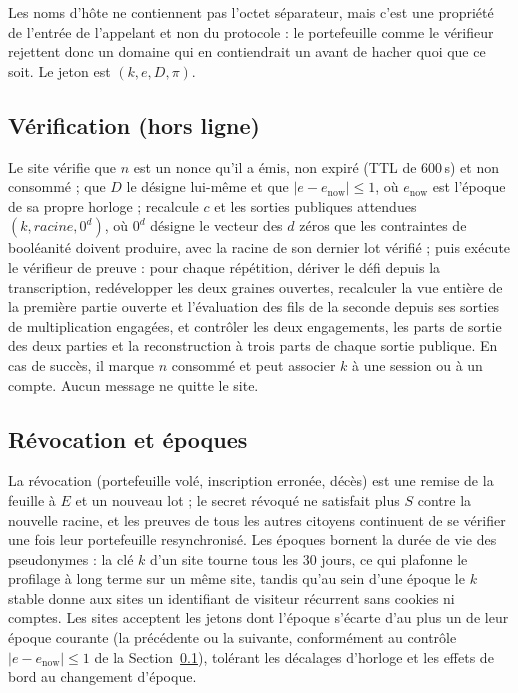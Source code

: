 \documentclass[11pt]{article}
\theoremstyle{definition}
\begin{document}
\noindent
Les noms d'hôte ne contiennent pas l'octet séparateur, mais c'est une propriété de
l'entrée de l'appelant et non du protocole : le portefeuille comme le vérifieur rejettent
donc un domaine qui en contiendrait un avant de hacher quoi que ce soit. Le jeton est $(k,
e, D, \pi)$.

\subsection{Vérification (hors ligne)}
\label{sec:verification}

Le site vérifie que $n$ est un nonce qu'il a émis, non expiré (TTL de 600\,s) et non
consommé ; que $D$ le désigne lui-même et que $|e - e_{\mathrm{now}}| \le 1$, où
$e_{\mathrm{now}}$ est l'époque de sa propre horloge ; recalcule $c$ et les sorties
publiques attendues $(k, \mathit{racine}, 0^d)$, où $0^d$ désigne le vecteur des $d$ zéros
que les contraintes de booléanité doivent produire, avec la racine de son
dernier lot vérifié ; puis exécute le vérifieur de preuve : pour chaque répétition,
dériver le défi depuis la transcription, redévelopper les deux graines ouvertes,
recalculer la vue entière de la première partie ouverte et l'évaluation des fils de la
seconde depuis ses sorties de multiplication engagées, et contrôler les deux engagements,
les parts de sortie des deux parties et la reconstruction à trois parts de chaque sortie
publique. En cas de succès, il marque $n$ consommé et peut associer $k$ à une session ou à
un compte. Aucun message ne quitte le site.

\subsection{Révocation et époques}

La révocation (portefeuille volé, inscription erronée, décès) est une remise de la feuille
à $E$ et un nouveau lot ; le secret révoqué ne satisfait plus $S$ contre la nouvelle
racine, et les preuves de tous les autres citoyens continuent de se vérifier une fois leur
portefeuille resynchronisé. Les époques bornent la durée de vie des pseudonymes : la clé
$k$ d'un site tourne tous les 30 jours, ce qui plafonne le profilage à long terme sur un
même site, tandis qu'au sein d'une époque le $k$ stable donne aux sites un identifiant de
visiteur récurrent sans cookies ni comptes. Les sites acceptent les jetons dont l'époque
s'écarte d'au plus un de leur époque courante (la précédente ou la suivante, conformément
au contrôle $|e - e_{\mathrm{now}}| \le 1$ de la Section~\ref{sec:verification}), tolérant
les décalages d'horloge et les effets de bord au changement d'époque.
\end{document}
